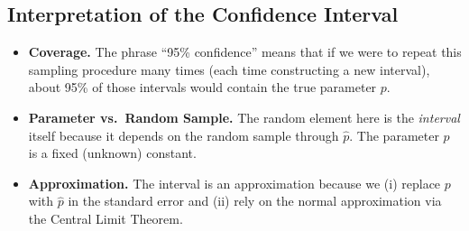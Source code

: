 \documentclass[11pt]{article}
\begin{document}
\subsection*{Interpretation of the Confidence Interval}

\begin{itemize}
  \item \textbf{Coverage.} The phrase ``95\% confidence'' means that if we were to repeat this sampling procedure many times (each time constructing a new interval), about 95\% of those intervals would contain the true parameter \(p\).
  \item \textbf{Parameter vs.\ Random Sample.} The random element here is the \emph{interval} itself because it depends on the random sample through \(\hat{p}\). The parameter \(p\) is a fixed (unknown) constant.
  \item \textbf{Approximation.} The interval is an approximation because we (i) replace \(p\) with \(\hat{p}\) in the standard error and (ii) rely on the normal approximation via the Central Limit Theorem.
\end{itemize}
\end{document}
